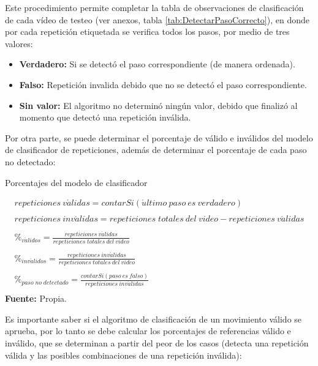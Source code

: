 Este procedimiento permite completar la tabla de observaciones de clasificaci\'on de cada v\'ideo de testeo (ver anexos, tabla \ref{tab:DetectarPasoCorrecto}), en donde por cada repetici\'on etiquetada se verifica todos los pasos, por medio de tres valores:
\begin{itemize}
\item \textbf{Verdadero:} Si se detect\'o el paso correspondiente (de manera ordenada).
\item \textbf{Falso:} Repetici\'on invalida debido que no se detect\'o el paso correspondiente. 
\item \textbf{Sin valor:} El algoritmo no determin\'o ning\'un valor, debido que finaliz\'o al momento  que detect\'o una repetici\'on inv\'alida.
\end{itemize}
Por otra parte, se puede determinar el porcentaje de v\'alido e inv\'alidos del modelo de clasificador de repeticiones, adem\'as de determinar el porcentaje de cada paso no detectado:
\begin{formula}[H]
	\centering
	\caption{Porcentajes del modelo de clasificador}
	\label{frm:porcentajeClasificador}
	\begin{equation}
\begin{matrix}
repeticiones\: v\acute{a}lidas = contarSi(\acute{u}ltimo\: paso\: es\: verdadero) \\ 
 \\ 
repeticiones\: inv\acute{a}lidas = repeticiones\; totales\: del\: video - repeticiones\: v\acute{a}lidas\\ 
 \\ 
\%_{v\acute{a}lidos}=\frac{repeticiones\: v\acute{a}lidas}{repeticiones\; totales\: del\: video}\\ 
\\
\%_{inv\acute{a}lidos}=\frac{repeticiones\: inv\acute{a}lidas}{repeticiones\; totales\: del\: video}\\ 
\\ 
\%_{paso\; no\; detectado}=\frac{contarSi(paso\: es\: falso)}{repeticiones\: inv\acute{a}lidas}\\ 
\end{matrix}
	\end{equation}
	\textbf{Fuente:} Propia.
\end{formula}
Es importante saber si el algoritmo de clasificaci\'on  de un movimiento v\'alido se aprueba, por lo tanto se debe calcular los porcentajes de referencias v\'alido e inv\'alido, que se determinan a partir del peor de los casos (detecta una repetici\'on v\'alida y las posibles combinaciones de una  repetici\'on inv\'alida): 
